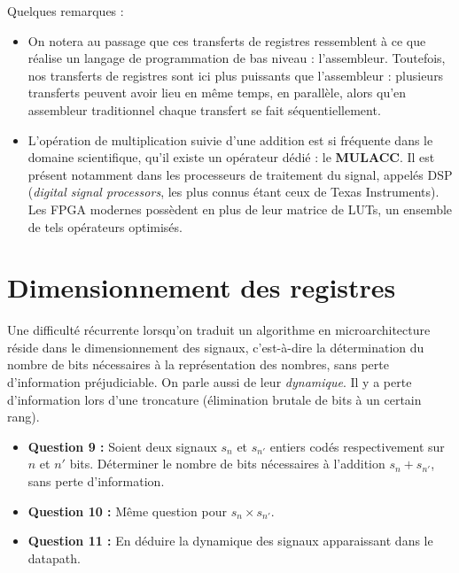 \documentclass[a4paper,11pt]{article}
\begin{document}
\begin{solbox}
\vspace{1em}
Quelques remarques :
\begin{itemize}
    \item On notera au passage que ces transferts de registres ressemblent à ce que réalise un langage de programmation de bas niveau : l'assembleur. Toutefois, nos transferts de registres sont ici plus puissants que l'assembleur : plusieurs transferts peuvent avoir lieu en même temps, en parallèle, alors qu'en assembleur traditionnel chaque transfert se fait séquentiellement.
    \item L'opération de multiplication suivie d'une addition est si fréquente dans le domaine scientifique, qu'il existe un opérateur dédié : le \textbf{MULACC}. Il est présent notamment dans les processeurs de traitement du signal, appelés DSP (\textit{digital signal processors}, les plus connus étant ceux de Texas Instruments). Les FPGA modernes possèdent en plus de leur matrice de LUTs, un ensemble de tels opérateurs optimisés.
\end{itemize}
\end{solbox}
\fi



\section{Dimensionnement des registres}

Une difficulté récurrente lorsqu'on traduit un algorithme en microarchitecture réside dans le dimensionnement des signaux, c'est-à-dire la détermination du nombre de bits nécessaires à la représentation des nombres, sans perte d'information préjudiciable. On parle aussi de leur \textit{dynamique}. Il y a perte d'information lors d'une troncature (élimination brutale de bits à un certain rang).

\begin{questionbox}
\begin{itemize}
    \item \textbf{Question 9 :} Soient deux signaux $s_n$ et $s_{n'}$ entiers codés respectivement sur $n$ et $n'$ bits. Déterminer le nombre de bits nécessaires à l'addition $s_n+s_{n'}$, sans perte d'information.
    \item \textbf{Question 10 :} Même question pour $s_n \times s_{n'}$.
    \item \textbf{Question 11 :} En déduire la dynamique des signaux apparaissant dans le datapath.
\end{itemize}
\end{questionbox}
\end{document}
